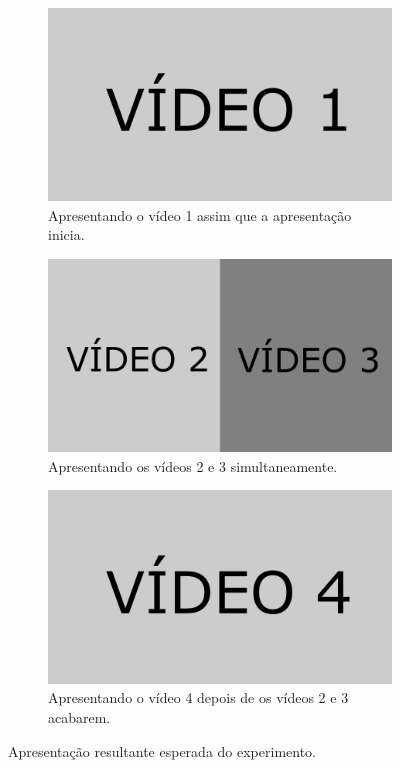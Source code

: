 \documentclass[../main.tex]{subfiles}
\begin{document}
\begin{figure}[!h]
\centering
  \begin{subfigure}[t]{0.31\linewidth}
    \includegraphics[width=0.98\linewidth]{IMG/Avaliacao/exp1.png}
    \caption{Apresentando o vídeo 1 assim que a apresentação inicia.}
  \end{subfigure}\hspace{0.02\linewidth}
  \begin{subfigure}[t]{0.31\linewidth}
    \includegraphics[width=0.98\linewidth]{IMG/Avaliacao/exp2.png}
    \caption{Apresentando os vídeos 2 e 3 simultaneamente.}
  \end{subfigure}\hspace{0.02\linewidth}
  \begin{subfigure}[t]{0.31\linewidth}
    \includegraphics[width=0.98\linewidth]{IMG/Avaliacao/exp3.png}
    \caption{Apresentando o vídeo 4 depois de os vídeos 2 e 3 acabarem.}
  \end{subfigure}
\caption{Apresentação resultante esperada do experimento.}
\label{fig:expected_presentation}
\end{figure}
\end{document}

